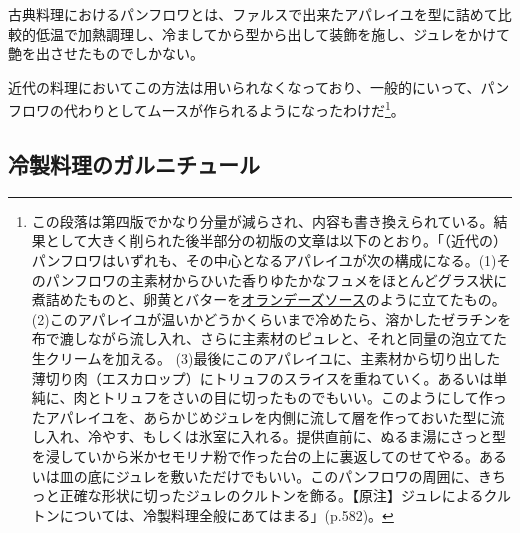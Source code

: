 

古典料理におけるパンフロワとは、ファルスで出来たアパレイユを型に詰めて比較的低温で加熱調理し、冷ましてから型から出して装飾を施し、ジュレをかけて艶を出させたものでしかない。

近代の料理においてこの方法は用いられなくなっており、一般的にいって、パンフロワの代わりとしてムースが作られるようになったわけだ\footnote{この段落は第四版でかなり分量が減らされ、内容も書き換えられている。結果として大きく削られた後半部分の初版の文章は以下のとおり。「（近代の）パンフロワはいずれも、その中心となるアパレイユが次の構成になる。(1)そのパンフロワの主素材からひいた香りゆたかなフュメをほとんどグラス状に煮詰めたものと、卵黄とバターを\protect\hyperlink{sauce-hollandaise}{オランデーズソース}のように立てたもの。(2)このアパレイユが温いかどうかくらいまで冷めたら、溶かしたゼラチンを布で漉しながら流し入れ、さらに主素材のピュレと、それと同量の泡立てた生クリームを加える。
  (3)最後にこのアパレイユに、主素材から切り出した薄切り肉（エスカロップ）にトリュフのスライスを重ねていく。あるいは単純に、肉とトリュフをさいの目に切ったものでもいい。このようにして作ったアパレイユを、あらかじめジュレを内側に流して層を作っておいた型に流し入れ、冷やす、もしくは氷室に入れる。提供直前に、ぬるま湯にさっと型を浸していから米かセモリナ粉で作った台の上に裏返してのせてやる。あるいは皿の底にジュレを敷いただけでもいい。このパンフロワの周囲に、きちっと正確な形状に切ったジュレのクルトンを飾る。【原注】ジュレによるクルトンについては、冷製料理全般にあてはまる」(p.582)。}。

\hypertarget{garnitures-de-mets-froids}{%
\subsection{冷製料理のガルニチュール}\label{garnitures-de-mets-froids}}


